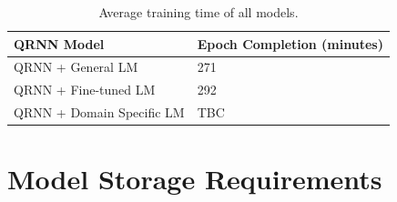 \documentclass[a4paper,twoside,phd]{BYUPhys}
\begin{document}
\begin{table}[H]
	\centering
	
	\begin{tabular}{|p{4.2cm}|p{5cm}|}
		\hline
		
		\textbf{QRNN Model} & \textbf{Epoch Completion \newline (minutes)}                                                                                                                                                                                                                                                                                                                                                    \\
		\hline                                                                                                                                              
		
		QRNN + General LM  & 271  \\
		\hline
		
		QRNN + \newline Fine-tuned LM  & 292  \\
		\hline
		
		QRNN + \newline Domain Specific LM  & TBC  \\
		\hline
		
		
	\end{tabular}
	\caption{Average training time of all models.}
	\label{table:QRNNTrainingTime}
\end{table}

\section{Model Storage Requirements}
\label{sec:StorageRequirements}
\end{document}
